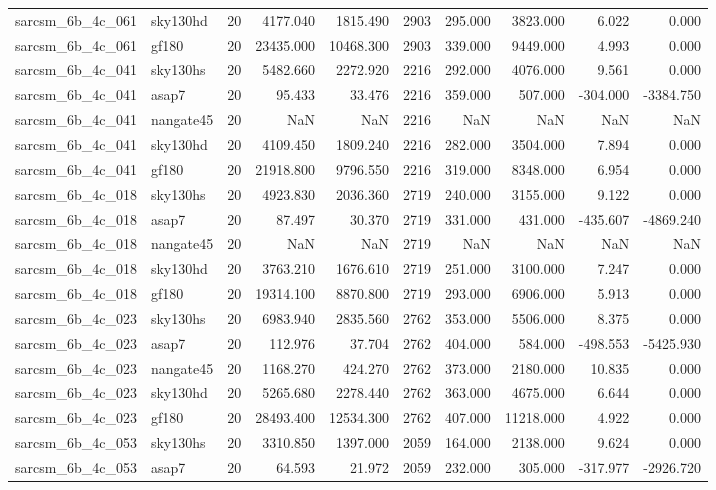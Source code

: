 \documentclass{article}
\begin{document}
\begin{longtable}{llrrrrrrrr}
sarcsm\_6b\_4c\_061 & sky130hd & 20 & 4177.040 & 1815.490 & 2903 & 295.000 & 3823.000 & 6.022 & 0.000 \\
sarcsm\_6b\_4c\_061 & gf180 & 20 & 23435.000 & 10468.300 & 2903 & 339.000 & 9449.000 & 4.993 & 0.000 \\
sarcsm\_6b\_4c\_041 & sky130hs & 20 & 5482.660 & 2272.920 & 2216 & 292.000 & 4076.000 & 9.561 & 0.000 \\
sarcsm\_6b\_4c\_041 & asap7 & 20 & 95.433 & 33.476 & 2216 & 359.000 & 507.000 & -304.000 & -3384.750 \\
sarcsm\_6b\_4c\_041 & nangate45 & 20 & NaN & NaN & 2216 & NaN & NaN & NaN & NaN \\
sarcsm\_6b\_4c\_041 & sky130hd & 20 & 4109.450 & 1809.240 & 2216 & 282.000 & 3504.000 & 7.894 & 0.000 \\
sarcsm\_6b\_4c\_041 & gf180 & 20 & 21918.800 & 9796.550 & 2216 & 319.000 & 8348.000 & 6.954 & 0.000 \\
sarcsm\_6b\_4c\_018 & sky130hs & 20 & 4923.830 & 2036.360 & 2719 & 240.000 & 3155.000 & 9.122 & 0.000 \\
sarcsm\_6b\_4c\_018 & asap7 & 20 & 87.497 & 30.370 & 2719 & 331.000 & 431.000 & -435.607 & -4869.240 \\
sarcsm\_6b\_4c\_018 & nangate45 & 20 & NaN & NaN & 2719 & NaN & NaN & NaN & NaN \\
sarcsm\_6b\_4c\_018 & sky130hd & 20 & 3763.210 & 1676.610 & 2719 & 251.000 & 3100.000 & 7.247 & 0.000 \\
sarcsm\_6b\_4c\_018 & gf180 & 20 & 19314.100 & 8870.800 & 2719 & 293.000 & 6906.000 & 5.913 & 0.000 \\
sarcsm\_6b\_4c\_023 & sky130hs & 20 & 6983.940 & 2835.560 & 2762 & 353.000 & 5506.000 & 8.375 & 0.000 \\
sarcsm\_6b\_4c\_023 & asap7 & 20 & 112.976 & 37.704 & 2762 & 404.000 & 584.000 & -498.553 & -5425.930 \\
sarcsm\_6b\_4c\_023 & nangate45 & 20 & 1168.270 & 424.270 & 2762 & 373.000 & 2180.000 & 10.835 & 0.000 \\
sarcsm\_6b\_4c\_023 & sky130hd & 20 & 5265.680 & 2278.440 & 2762 & 363.000 & 4675.000 & 6.644 & 0.000 \\
sarcsm\_6b\_4c\_023 & gf180 & 20 & 28493.400 & 12534.300 & 2762 & 407.000 & 11218.000 & 4.922 & 0.000 \\
sarcsm\_6b\_4c\_053 & sky130hs & 20 & 3310.850 & 1397.000 & 2059 & 164.000 & 2138.000 & 9.624 & 0.000 \\
sarcsm\_6b\_4c\_053 & asap7 & 20 & 64.593 & 21.972 & 2059 & 232.000 & 305.000 & -317.977 & -2926.720 \\

\end{longtable}
\end{document}
